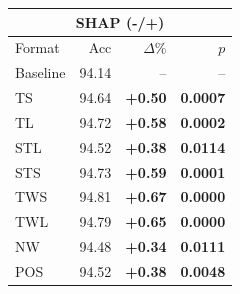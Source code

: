 \begin{tabular}{lrrr}
\toprule
\multicolumn{4}{c}{\textbf{SHAP (-/+)}} \\
\midrule
Format & Acc & $\Delta$\% & $p$ \\
\midrule
Baseline & 94.14 & -- & -- \\
\midrule
TS & 94.64 & \textbf{+0.50} & \textbf{0.0007} \\
TL & 94.72 & \textbf{+0.58} & \textbf{0.0002} \\
STL & 94.52 & \textbf{+0.38} & \textbf{0.0114} \\
STS & 94.73 & \textbf{+0.59} & \textbf{0.0001} \\
TWS & 94.81 & \textbf{+0.67} & \textbf{0.0000} \\
TWL & 94.79 & \textbf{+0.65} & \textbf{0.0000} \\
NW & 94.48 & \textbf{+0.34} & \textbf{0.0111} \\
POS & 94.52 & \textbf{+0.38} & \textbf{0.0048} \\
\bottomrule
\end{tabular}